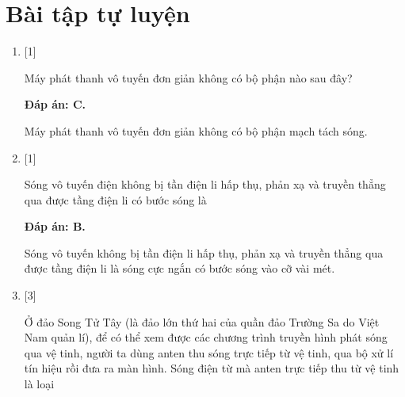 \section{Bài tập tự luyện}
\begin{enumerate}[label=\bfseries Câu \arabic*:]
	
	\item {} [1]
	\cauhoi
	{Máy phát thanh vô tuyến đơn giản không có bộ phận nào sau đây?
	}
	
	\loigiai
	{		\textbf{Đáp án: C.}
		
		Máy phát thanh vô tuyến đơn giản không có bộ phận mạch tách sóng.
	} 
	
	\item {} [1]
	\cauhoi
	{Sóng vô tuyến điện không bị tần điện li hấp thụ, phản xạ và truyền thẳng qua được tầng điện li có bước sóng là
	}
	
	\loigiai
	{		\textbf{Đáp án: B.}
		
		Sóng vô tuyến không bị tần điện li hấp thụ, phản xạ và truyền thẳng qua được tầng điện li là sóng cực ngắn có bước sóng vào cỡ vài mét.
		
	}
	
	\item {} [3]
	\cauhoi
	{Ở đảo Song Tử Tây (là đảo lớn thứ hai của quần đảo Trường Sa do Việt Nam quản lí), để có thể xem được các chương trình truyền hình phát sóng qua vệ tinh, người ta dùng anten thu sóng trực tiếp từ vệ tinh, qua bộ xử lí tín hiệu rồi đưa ra màn hình. Sóng điện từ mà anten trực tiếp thu từ vệ tinh là loại 
	}
	

\end{enumerate}
